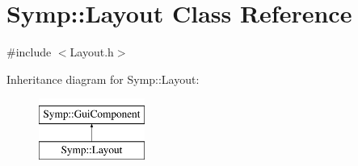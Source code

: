 \hypertarget{class_symp_1_1_layout}{\section{Symp\-:\-:Layout Class Reference}
\label{class_symp_1_1_layout}
}


{\ttfamily \#include $<$Layout.\-h$>$}

Inheritance diagram for Symp\-:\-:Layout\-:\begin{figure}[H]
\begin{center}
\leavevmode
\includegraphics[height=2.000000cm]{class_symp_1_1_layout}
\end{center}
\end{figure}
